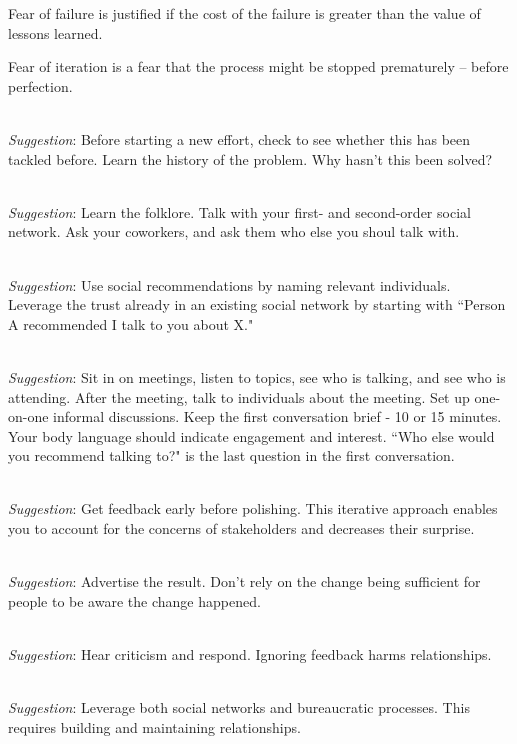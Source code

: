 Fear of failure is justified if the cost of the failure is greater than the value of lessons learned.

Fear of iteration is a fear that the process might be stopped prematurely -- before perfection.

\ \\
\textit{Suggestion}: Before starting a new effort, check to see whether this has been tackled before.
%
%
Learn the history of the problem. Why hasn't this been solved?

\ \\
\textit{Suggestion}: Learn the folklore. Talk with your first- and second-order social network.
Ask your coworkers, and ask them who else you shoul talk with.

\ \\
\textit{Suggestion}: Use social recommendations by naming relevant individuals.\\
Leverage the trust already in an existing social network by starting with ``Person A recommended I talk to you about X."


\ \\
\textit{Suggestion}: Sit in on meetings, listen to topics, see who is talking, and see who is attending. After the meeting, talk to individuals about the meeting. Set up one-on-one informal discussions. Keep the first conversation brief - 10 or 15 minutes. Your body language should indicate engagement and interest. ``Who else would you recommend talking to?" is the last question in the first conversation.

\ \\
\textit{Suggestion}: Get feedback early before polishing. This iterative approach enables you to account for the concerns of stakeholders and decreases their surprise.

\ \\
\textit{Suggestion}: Advertise the result. Don't rely on the change being sufficient for people to be aware the change happened.

\ \\
\textit{Suggestion}: Hear criticism and respond. Ignoring feedback harms relationships.

\ \\
\textit{Suggestion}: Leverage both social networks and bureaucratic processes. This requires building and maintaining relationships. 

